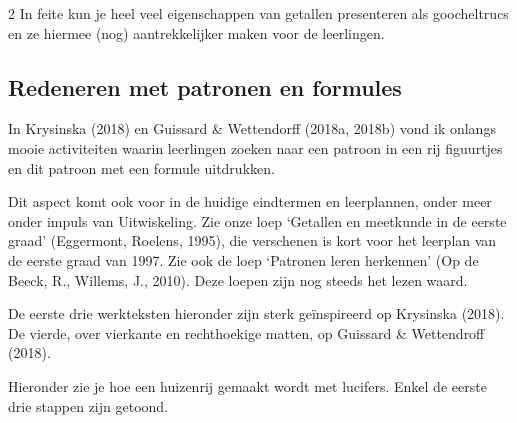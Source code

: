 \begin{multicols}{2}
In feite kun je heel veel eigenschappen van getallen presenteren als goocheltrucs en ze hiermee (nog) aantrekkelijker maken voor de leerlingen.


\subsection{Redeneren met patronen en formules}

In Krysinska (2018) en Guissard \& Wettendorff (2018a, 2018b) vond ik onlangs mooie activiteiten waarin leerlingen zoeken naar een patroon in een rij figuurtjes en dit patroon met een formule uitdrukken.

Dit aspect komt ook voor in de huidige eindtermen en leerplannen, onder meer onder impuls van Uitwiskeling. Zie onze loep ‘Getallen en meetkunde in de eerste graad’ (Eggermont, Roelens, 1995), die verschenen is kort voor het leerplan van de eerste graad van 1997. Zie ook de loep ‘Patronen leren herkennen’ (Op de Beeck, R., Willems, J., 2010). Deze loepen zijn  nog steeds het lezen waard.

De eerste drie werkteksten hieronder zijn sterk geïnspireerd op Krysinska (2018). De vierde, over vierkante en rechthoekige matten, op Guissard \& Wettendroff (2018).
\end{multicols}
\newpage
{}

Hieronder zie je hoe een huizenrij gemaakt wordt met lucifers. Enkel de eerste drie stappen zijn getoond.


